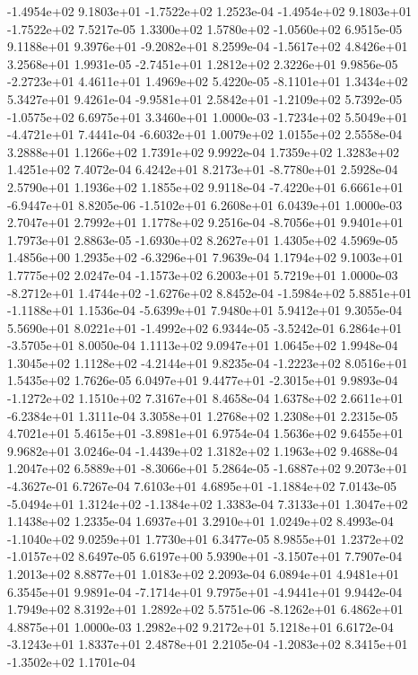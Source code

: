 -1.4954e+02  9.1803e+01 -1.7522e+02  1.2523e-04
-1.4954e+02  9.1803e+01 -1.7522e+02  7.5217e-05
 1.3300e+02  1.5780e+02 -1.0560e+02  6.9515e-05
 9.1188e+01  9.3976e+01 -9.2082e+01  8.2599e-04
-1.5617e+02  4.8426e+01  3.2568e+01  1.9931e-05
-2.7451e+01  1.2812e+02  2.3226e+01  9.9856e-05
-2.2723e+01  4.4611e+01  1.4969e+02  5.4220e-05
-8.1101e+01  1.3434e+02  5.3427e+01  9.4261e-04
-9.9581e+01  2.5842e+01 -1.2109e+02  5.7392e-05
-1.0575e+02  6.6975e+01  3.3460e+01  1.0000e-03
-1.7234e+02  5.5049e+01 -4.4721e+01  7.4441e-04
-6.6032e+01  1.0079e+02  1.0155e+02  2.5558e-04
3.2888e+01 1.1266e+02 1.7391e+02  9.9922e-04
1.7359e+02 1.3283e+02 1.4251e+02  7.4072e-04
 6.4242e+01  8.2173e+01 -8.7780e+01  2.5928e-04
2.5790e+01 1.1936e+02 1.1855e+02  9.9118e-04
-7.4220e+01  6.6661e+01 -6.9447e+01  8.8205e-06
-1.5102e+01  6.2608e+01  6.0439e+01  1.0000e-03
2.7047e+01 2.7992e+01 1.1778e+02  9.2516e-04
-8.7056e+01  9.9401e+01  1.7973e+01  2.8863e-05
-1.6930e+02  8.2627e+01  1.4305e+02  4.5969e-05
 1.4856e+00  1.2935e+02 -6.3296e+01  7.9639e-04
1.1794e+02 9.1003e+01 1.7775e+02  2.0247e-04
-1.1573e+02  6.2003e+01  5.7219e+01  1.0000e-03
-8.2712e+01  1.4744e+02 -1.6276e+02  8.8452e-04
-1.5984e+02  5.8851e+01 -1.1188e+01  1.1536e-04
-5.6399e+01  7.9480e+01  5.9412e+01  9.3055e-04
 5.5690e+01  8.0221e+01 -1.4992e+02  6.9344e-05
-3.5242e-01  6.2864e+01 -3.5705e+01  8.0050e-04
1.1113e+02 9.0947e+01 1.0645e+02  1.9948e-04
 1.3045e+02  1.1128e+02 -4.2144e+01  9.8235e-04
-1.2223e+02  8.0516e+01  1.5435e+02  1.7626e-05
 6.0497e+01  9.4477e+01 -2.3015e+01  9.9893e-04
-1.1272e+02  1.1510e+02  7.3167e+01  8.4658e-04
 1.6378e+02  2.6611e+01 -6.2384e+01  1.3111e-04
3.3058e+01 1.2768e+02 1.2308e+01  2.2315e-05
 4.7021e+01  5.4615e+01 -3.8981e+01  6.9754e-04
1.5636e+02 9.6455e+01 9.9682e+01  3.0246e-04
-1.4439e+02  1.3182e+02  1.1963e+02  9.4688e-04
 1.2047e+02  6.5889e+01 -8.3066e+01  5.2864e-05
-1.6887e+02  9.2073e+01 -4.3627e-01  6.7267e-04
 7.6103e+01  4.6895e+01 -1.1884e+02  7.0143e-05
-5.0494e+01  1.3124e+02 -1.1384e+02  1.3383e-04
7.3133e+01 1.3047e+02 1.1438e+02  1.2335e-04
1.6937e+01 3.2910e+01 1.0249e+02  8.4993e-04
-1.1040e+02  9.0259e+01  1.7730e+01  6.3477e-05
 8.9855e+01  1.2372e+02 -1.0157e+02  8.6497e-05
 6.6197e+00  5.9390e+01 -3.1507e+01  7.7907e-04
1.2013e+02 8.8877e+01 1.0183e+02  2.2093e-04
6.0894e+01 4.9481e+01 6.3545e+01  9.9891e-04
-7.1714e+01  9.7975e+01 -4.9441e+01  9.9442e-04
1.7949e+02 8.3192e+01 1.2892e+02  5.5751e-06
-8.1262e+01  6.4862e+01  4.8875e+01  1.0000e-03
1.2982e+02 9.2172e+01 5.1218e+01  6.6172e-04
-3.1243e+01  1.8337e+01  2.4878e+01  2.2105e-04
-1.2083e+02  8.3415e+01 -1.3502e+02  1.1701e-04
